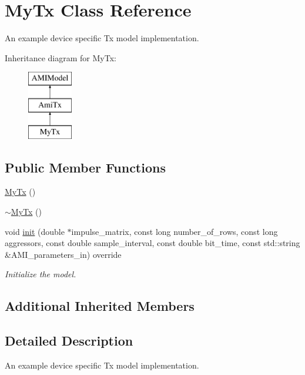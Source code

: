 \hypertarget{class_my_tx}{}\section{My\+Tx Class Reference}
\label{class_my_tx}


An example device specific Tx model implementation.  


Inheritance diagram for My\+Tx\+:\begin{figure}[H]
\begin{center}
\leavevmode
\includegraphics[height=3.000000cm]{class_my_tx}
\end{center}
\end{figure}
\subsection*{Public Member Functions}
\begin{DoxyCompactItemize}
\item 
\hyperlink{class_my_tx_a1fe85e2eeacfdc9fb6b1bf77702243be}{My\+Tx} ()
\item 
\hyperlink{class_my_tx_ab7d79dd462919d22f1ec7e33e448e0ff}{$\sim$\+My\+Tx} ()
\item 
void \hyperlink{class_my_tx_a4166bdab63c2366409998b2e606f55d2}{init} (double $\ast$impulse\+\_\+matrix, const long number\+\_\+of\+\_\+rows, const long aggressors, const double sample\+\_\+interval, const double bit\+\_\+time, const std\+::string \&A\+M\+I\+\_\+parameters\+\_\+in) override
\begin{DoxyCompactList}\small\item\em Initialize the model. \end{DoxyCompactList}\end{DoxyCompactItemize}
\subsection*{Additional Inherited Members}


\subsection{Detailed Description}
An example device specific Tx model implementation. 

